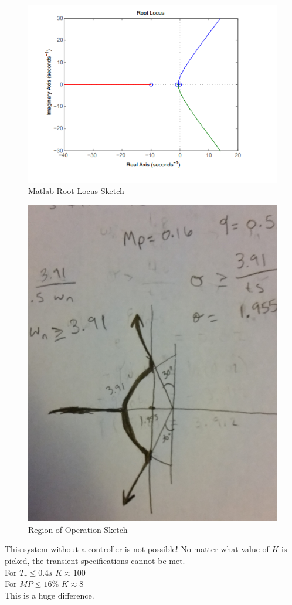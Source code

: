 \documentclass[12pt,letter]{article}
\begin{document}
\begin{figure}[H]
\centering
\includegraphics[width=1\linewidth]{rootlocus}
\caption{Matlab Root Locus Sketch}
\label{fig:rootlocus}
\end{figure}
	
\begin{figure}[H]
\centering
\includegraphics[width=.7\linewidth]{region}
\caption{Region of Operation Sketch}
\label{fig:region}
\end{figure}

\noindent This system without a controller is not possible! No matter what value of $K$ is picked, the transient specifications cannot be met. \\
For $T_r\le0.4s$ $K\approx100$ \\
For $MP\le16\%$ $K\approx8$\\
This is a huge difference.
\end{document}
